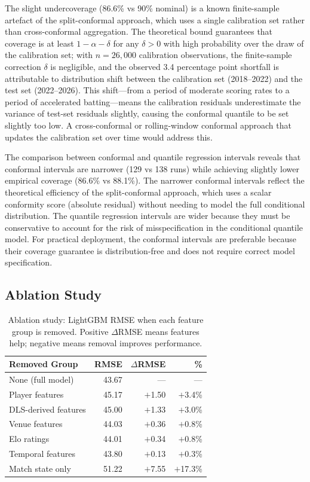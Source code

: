 \documentclass[10pt,a4paper,twocolumn]{article}
\begin{document}
The slight undercoverage (86.6\% vs 90\% nominal) is a known finite-sample artefact of the split-conformal approach, which uses a single calibration set rather than cross-conformal aggregation. The theoretical bound guarantees that coverage is at least $1 - \alpha - \delta$ for any $\delta > 0$ with high probability over the draw of the calibration set; with $n = 26,000$ calibration observations, the finite-sample correction $\delta$ is negligible, and the observed 3.4 percentage point shortfall is attributable to distribution shift between the calibration set (2018--2022) and the test set (2022--2026). This shift---from a period of moderate scoring rates to a period of accelerated batting---means the calibration residuals underestimate the variance of test-set residuals slightly, causing the conformal quantile to be set slightly too low. A cross-conformal or rolling-window conformal approach that updates the calibration set over time would address this.

The comparison between conformal and quantile regression intervals reveals that conformal intervals are narrower (129 vs 138 runs) while achieving slightly lower empirical coverage (86.6\% vs 88.1\%). The narrower conformal intervals reflect the theoretical efficiency of the split-conformal approach, which uses a scalar conformity score (absolute residual) without needing to model the full conditional distribution. The quantile regression intervals are wider because they must be conservative to account for the risk of misspecification in the conditional quantile model. For practical deployment, the conformal intervals are preferable because their coverage guarantee is distribution-free and does not require correct model specification.

\subsection{Ablation Study}
\label{sec:ablation}

\begin{table}[H]
\centering
\caption{Ablation study: LightGBM RMSE when each feature group is removed. Positive $\Delta$RMSE means features help; negative means removal improves performance.}
\label{tab:ablation}
\small
\begin{tabular}{@{}lrrr@{}}
\toprule
\textbf{Removed Group} & \textbf{RMSE} & \textbf{$\Delta$RMSE} & \textbf{\%} \\
\midrule
None (full model)      & 43.67 & ---   & --- \\
\midrule
Player features        & 45.17 & $+$1.50 & $+$3.4\% \\
DLS-derived features   & 45.00 & $+$1.33 & $+$3.0\% \\
Venue features         & 44.03 & $+$0.36 & $+$0.8\% \\
Elo ratings            & 44.01 & $+$0.34 & $+$0.8\% \\
Temporal features      & 43.80 & $+$0.13 & $+$0.3\% \\
Match state only       & 51.22 & $+$7.55 & $+$17.3\% \\
\bottomrule
\end{tabular}
\end{table}
\end{document}
